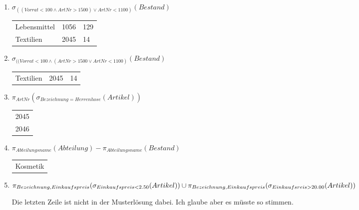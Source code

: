 \documentclass{lehramt-informatik-haupt}
\begin{document}
\begin{enumerate}
\begin{enumerate}
\item $\sigma_{((Vorrat < 100 \land ArtNr > 1500) \lor ArtNr < 1100)}(Bestand)$

\begin{antwort}[muster]
\begin{tabular}{lll}
Lebensmittel    & 1056  & 129    \\
Textilien       & 2045  & 14
\end{tabular}
\end{antwort}


\item $\sigma_{((Vorrat < 100 \land (ArtNr > 1500  \lor ArtNr < 1100)}(Bestand)$

\begin{antwort}[muster]
\begin{tabular}{lll}
Textilien       & 2045  & 14
\end{tabular}
\end{antwort}


\item $\pi_{ArtNr}(\sigma_{Bezeichnung=Herrenhose}(Artikel))$

\begin{antwort}[muster]
\begin{tabular}{l}
2045 \\
2046
\end{tabular}
\end{antwort}


\item $\pi_{Abteilungsname}(Abteilung) - \pi_{Abteilungsname} (Bestand)$

\begin{antwort}[muster]
\begin{tabular}{l}
Kosmetik
\end{tabular}
\end{antwort}


\item

\begin{math}
\pi_{Bezeichnung,Einkaufspreis}(\sigma_{Einkaufspreis < 2.50} (Artikel))
\cup\\
\pi_{Bezeichnung,Einkaufspreis}(\sigma_{Einkaufsreis > 20.00} (Artikel))
\end{math}

\begin{antwort}[muster]
Die letzten Zeile ist nicht in der Musterlösung dabei. Ich glaube aber
es müsste so stimmen.


\end{antwort}
\end{enumerate}
\end{enumerate}
\end{document}
